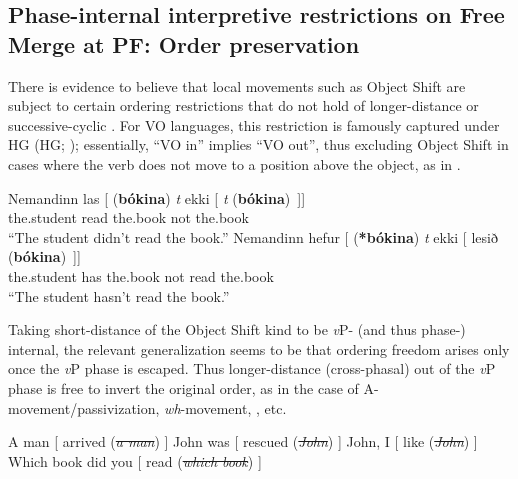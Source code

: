\documentclass[output=paper]{langsci/langscibook}
\begin{document}
\subsection{Phase-internal interpretive restrictions on Free Merge at PF: Order
preservation}\label{sub:key:22.2.1}

There is evidence to believe that local movements such as Object Shift are
subject to certain ordering restrictions that do not hold of longer-distance or
successive-cyclic . For VO languages, this restriction is famously
captured under \glsdesc{HG} (\gls{HG};
\citealt{Holmberg1986,Holmberg1999}); essentially, \enquote{VO in} implies \enquote{VO out},
thus excluding Object Shift in cases where the verb does not move to a position
above the object, as in .

\ea\label{ex:key:22.5} 
    \ea\label{ex:key:22.5a}
        \gll    Nemandinn  las   [\emph{} (\textbf{bókina}) \emph{t} ekki [ \emph{t} (\textbf{bókina})~]] \\
                the.student read {} \hphantom{(}the.book {} not {} {} \hphantom{(}the.book\\
        \glt \enquote{The student didn't read the book.}
    \ex\label{ex:key:22.5b}
        \gll    Nemandinn hefur [\emph{} (\textbf{*bókina}) \emph{t} ekki [ lesið (\textbf{bókina})~]]\\
                the.student has {} \hphantom{(*}the.book {} not {} read \hphantom{(}the.book\\
        \glt \enquote{The student hasn't read the book.}
    \z
\z

Taking short-distance  of the Object Shift kind to be \emph{v}P- (and
thus phase-) internal, the relevant generalization seems to be that ordering
freedom arises only once the \emph{v}P phase is escaped. Thus longer-distance
(cross-phasal)  out of the \emph{v}P phase is free to invert the
original order, as in the case of A-movement/passivization, \emph{wh}-movement,
, etc.\largerpage

\ea\label{ex:key:22.6}
\ea  A man [\emph{} arrived (\sout{\emph{a man}}) ]
\ex John was [\emph{} rescued (\sout{\emph{John}}) ]
\ex John, I [\emph{} like (\sout{\emph{John}}) ]
    \ex Which book did you [\emph{} read (\sout{\emph{which
    book}}) ]
    \z
\z
\end{document}
